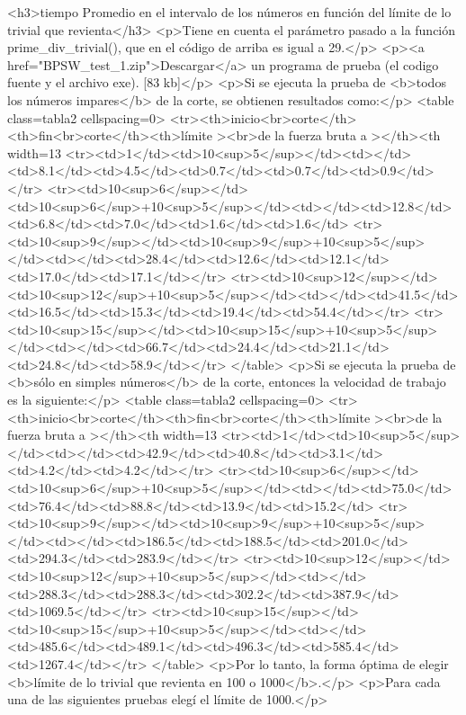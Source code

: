 <h3>tiempo Promedio en el intervalo de los números en función del límite de lo trivial que revienta</h3>
<p>Tiene en cuenta el parámetro pasado a la función prime_div_trivial(), que en el código de arriba es igual a 29.</p>
<p><a href="BPSW_test_1.zip">Descargar</a> un programa de prueba (el codigo fuente y el archivo exe). [83 kb]</p>
<p>Si se ejecuta la prueba de <b>todos los números impares</b> de la corte, se obtienen resultados como:</p>
<table class=tabla2 cellspacing=0>
<tr><th>inicio<br>corte</th><th>fin<br>corte</th><th>límite ><br>de la fuerza bruta a ></th><th width=13%
<tr><td>1</td><td>10<sup>5</sup></td><td></td><td>8.1</td><td>4.5</td><td>0.7</td><td>0.7</td><td>0.9</td></tr>
<tr><td>10<sup>6</sup></td><td>10<sup>6</sup>+10<sup>5</sup></td><td></td><td>12.8</td><td>6.8</td><td>7.0</td><td>1.6</td><td>1.6</td>
<tr><td>10<sup>9</sup></td><td>10<sup>9</sup>+10<sup>5</sup></td><td></td><td>28.4</td><td>12.6</td><td>12.1</td><td>17.0</td><td>17.1</td></tr>
<tr><td>10<sup>12</sup></td><td>10<sup>12</sup>+10<sup>5</sup></td><td></td><td>41.5</td><td>16.5</td><td>15.3</td><td>19.4</td><td>54.4</td></tr>
<tr><td>10<sup>15</sup></td><td>10<sup>15</sup>+10<sup>5</sup></td><td></td><td>66.7</td><td>24.4</td><td>21.1</td><td>24.8</td><td>58.9</td></tr>
</table>
<p>Si se ejecuta la prueba de <b>sólo en simples números</b> de la corte, entonces la velocidad de trabajo es la siguiente:</p>
<table class=tabla2 cellspacing=0>
<tr><th>inicio<br>corte</th><th>fin<br>corte</th><th>límite ><br>de la fuerza bruta a ></th><th width=13%
<tr><td>1</td><td>10<sup>5</sup></td><td></td><td>42.9</td><td>40.8</td><td>3.1</td><td>4.2</td><td>4.2</td></tr>
<tr><td>10<sup>6</sup></td><td>10<sup>6</sup>+10<sup>5</sup></td><td></td><td>75.0</td><td>76.4</td><td>88.8</td><td>13.9</td><td>15.2</td>
<tr><td>10<sup>9</sup></td><td>10<sup>9</sup>+10<sup>5</sup></td><td></td><td>186.5</td><td>188.5</td><td>201.0</td><td>294.3</td><td>283.9</td></tr>
<tr><td>10<sup>12</sup></td><td>10<sup>12</sup>+10<sup>5</sup></td><td></td><td>288.3</td><td>288.3</td><td>302.2</td><td>387.9</td><td>1069.5</td></tr>
<tr><td>10<sup>15</sup></td><td>10<sup>15</sup>+10<sup>5</sup></td><td></td><td>485.6</td><td>489.1</td><td>496.3</td><td>585.4</td><td>1267.4</td></tr>
</table>
<p>Por lo tanto, la forma óptima de elegir <b>límite de lo trivial que revienta en 100 o 1000</b>.</p>
<p>Para cada una de las siguientes pruebas elegí el límite de 1000.</p>


